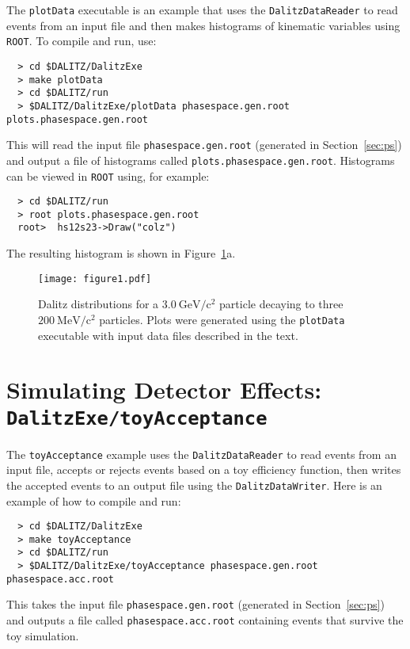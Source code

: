 \documentclass[11pt]{article}
\newcommand{\gevcc}{\mathrm{GeV/c^2}}
\newcommand{\mevcc}{\mathrm{MeV/c^2}}
\begin{document}
The {\tt plotData} executable is an example that uses the {\tt DalitzDataReader} to read events from an input file and then makes histograms of kinematic variables using {\tt ROOT}.  To compile and run, use:
\begin{verbatim}
  > cd $DALITZ/DalitzExe
  > make plotData
  > cd $DALITZ/run
  > $DALITZ/DalitzExe/plotData phasespace.gen.root plots.phasespace.gen.root
\end{verbatim}
This will read the input file {\tt phasespace.gen.root} (generated in Section~\ref{sec:ps}) and output a file of histograms called {\tt plots.phasespace.gen.root}.  Histograms can be viewed in {\tt ROOT} using, for example:
\begin{verbatim}
  > cd $DALITZ/run
  > root plots.phasespace.gen.root
  root>  hs12s23->Draw("colz")
\end{verbatim}
The resulting histogram is shown in Figure~\ref{fig:dalitz}a.

\begin{figure}[h!]
\begin{center}
\texttt{[image: figure1.pdf]}
\caption{Dalitz distributions for a $3.0~\gevcc$ particle decaying to three $200~\mevcc$ particles.  Plots were generated using the {\tt plotData} executable with input data files described in the text.
\label{fig:dalitz}}
\end{center}
\end{figure}


\section{Simulating Detector Effects: \\
{\tt DalitzExe/toyAcceptance}}
\label{sec:eff}

The {\tt toyAcceptance} example uses the {\tt DalitzDataReader} to read events from an input file, accepts or rejects events based on a toy efficiency function, then writes the accepted events to an output file using the {\tt DalitzDataWriter}.  Here is an example of how to compile and run:
\begin{verbatim}
  > cd $DALITZ/DalitzExe
  > make toyAcceptance
  > cd $DALITZ/run
  > $DALITZ/DalitzExe/toyAcceptance phasespace.gen.root phasespace.acc.root
\end{verbatim}
This takes the input file {\tt phasespace.gen.root} (generated in Section~\ref{sec:ps}) and outputs a file called {\tt phasespace.acc.root} containing events that survive the toy simulation.
\end{document}
